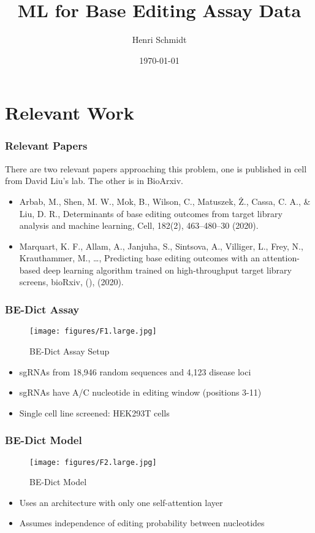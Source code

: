 \documentclass{beamer}
\title{ML for Base Editing Assay Data}
\date{\today}
\author{Henri Schmidt}
\institute{Memorial Sloan Kettering Cancer Center}
\begin{document}
\maketitle

\section{Relevant Work}
\begin{frame}
  \frametitle{Relevant Papers} There are two relevant papers
  approaching this problem, one is published in cell from David Liu's
  lab. The other is in BioArxiv.
  \vspace{0.5em}
  \begin{itemize}
  \item Arbab, M., Shen, M. W., Mok, B., Wilson, C., Matuszek, Ż.,
    Cassa, C. A., \& Liu, D. R., Determinants of base editing outcomes
    from target library analysis and machine learning, Cell, 182(2),
    463–480–30 (2020).
  \item Marquart, K. F., Allam, A., Janjuha, S., Sintsova, A.,
    Villiger, L., Frey, N., Krauthammer, M., …, Predicting base
    editing outcomes with an attention-based deep learning algorithm
    trained on high-throughput target library screens, bioRxiv, (),
    (2020).
  \end{itemize}
\end{frame}

\begin{frame}
  \frametitle{BE-Dict Assay}

  \begin{figure}[ht]
    \centering
    \texttt{[image: figures/F1.large.jpg]}
    \caption{\label{fig:label} BE-Dict Assay Setup}
  \end{figure}

  \begin{itemize}
  \item sgRNAs from 18,946 random sequences and 4,123 disease loci
  \item sgRNAs have A/C nucleotide in editing window (positions 3-11)
  \item Single cell line screened: HEK293T cells
  \end{itemize}
\end{frame}

\begin{frame}
  \frametitle{BE-Dict Model}

  \begin{figure}[ht]
    \centering
    \texttt{[image: figures/F2.large.jpg]}
    \caption{\label{fig:label} BE-Dict Model}
  \end{figure}

  \begin{itemize}
  \item Uses an architecture with only one
    self-attention layer
  \item Assumes independence of editing probability between
    nucleotides
  \end{itemize}
\end{frame}
\end{document}
